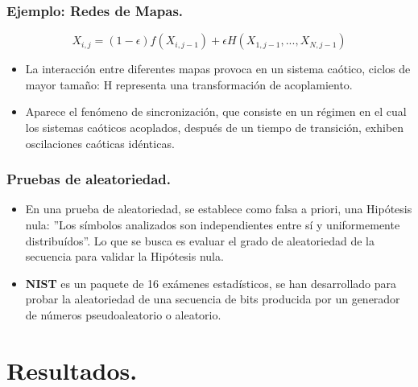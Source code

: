 \documentclass[xcolor=table]{beamer}
\begin{document}
\begin{frame}
\frametitle{Ejemplo: Redes de Mapas.}
\begin{equation}
X_{i,j}=(1 - \epsilon)f(X_{i,j-1})+ \epsilon H(X_{1,j-1},...,X_{N,j-1})
\end{equation}
\begin{itemize}
\item La interacción entre diferentes mapas provoca en un sistema caótico, ciclos de mayor tamaño: H representa una transformación de acoplamiento.

\item  Aparece el fenómeno de sincronización, que consiste en un régimen en el cual los sistemas caóticos acoplados, después de un tiempo de transición, exhiben oscilaciones caóticas idénticas.
\end{itemize}

\end{frame}




\begin{frame}
\frametitle{Pruebas de aleatoriedad.}
\begin{itemize}
\item En una prueba de aleatoriedad, se establece como falsa a priori, una Hipótesis nula: ''Los símbolos analizados son independientes entre sí y uniformemente distribuídos''. Lo que se busca es evaluar el grado de aleatoriedad de la secuencia para validar la Hipótesis nula.
\item \textbf{NIST} es un paquete de 16 exámenes estadísticos, se han desarrollado para probar la aleatoriedad de una secuencia de bits producida por un generador de números pseudoaleatorio o aleatorio.
\end{itemize}
\end{frame}


\section{Resultados.}
\end{document}
